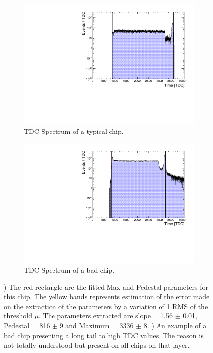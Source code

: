 \begin{figure}[htbp!]
	\begin{subfigure}[t]{0.5\textwidth}
		\centering
		\includegraphics[width=1\linewidth]{chap5/fig_AHCAL_timing/Muons/ExampleTDCSpectra}
		\caption{TDC Spectrum of a typical chip.} \label{fig:TDC_Spectrum}
	\end{subfigure}
	\hfill
	\begin{subfigure}[t]{0.5\textwidth}
		\centering
		\includegraphics[width=1\linewidth]{chap5/fig_AHCAL_timing/Muons/BadTDCSpectra_Layer12}
		\caption{TDC Spectrum of a bad chip.} \label{fig:TDC_Spectrum_bad}
	\end{subfigure}
	\caption{) The red rectangle are the fitted Max and Pedestal parameters for this chip. The yellow bands represents estimation of the error made on the extraction of the parameters by a variation of 1 RMS of the threshold $\mu$. The parameters extracted are slope = 1.56 $\pm$ 0.01, Pedestal = 816 $\pm$ 9 and Maximum = 3336 $\pm$ 8. ) An example of a bad chip presenting a long tail to high TDC values. The reason is not totally understood but present on all chips on that layer.}
\end{figure}

